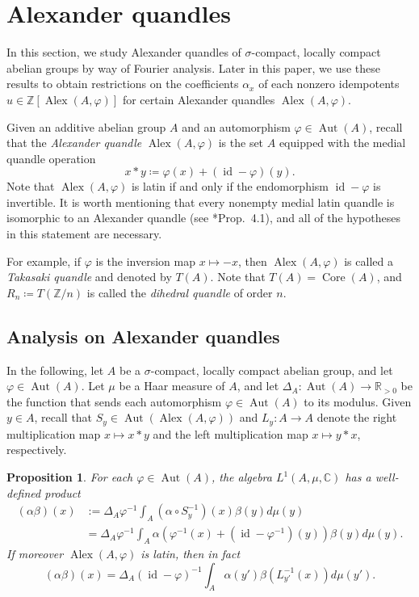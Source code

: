\documentclass[12pt]{amsart}
\newtheorem{pro}[thm]{Proposition}
\theoremstyle{definition}
\theoremstyle{remark}
\newcommand{\Id}{\operatorname{id}}
\newcommand{\C}{\mathbb{C}}
\newcommand{\R}{\mathbb{R}}
\newcommand{\Z}{\mathbb{Z}}
\renewcommand{\phi}{\varphi}
\def\Aut{\operatorname{Aut}}
\def\Core{\operatorname{Core}}
\def\Alex{\operatorname{Alex}}
\begin{document}
 


\section{Alexander quandles}\label{sec:alexander}

In this section, we study Alexander quandles of $\sigma$-compact, locally compact abelian groups by way of Fourier analysis. Later in this paper, we use these results to obtain restrictions on the coefficients $\alpha_x$ of each nonzero idempotents $u\in\Z[\Alex(A,\phi)]$ for certain Alexander quandles $\Alex(A,\phi)$.

Given an additive abelian group $A$ and an automorphism $\phi\in\Aut(A)$, recall that the \emph{Alexander quandle} $\Alex(A,\phi)$ is the set $A$ equipped with the medial quandle operation
\[
x*y\coloneq \phi(x)+(\Id-\phi)(y).
\]
Note that $\Alex(A,\phi)$ is latin if and only if the endomorphism $\Id-\phi$ is invertible.
It is worth mentioning that every nonempty medial latin quandle is isomorphic to an Alexander quandle (see \cite{ta-2026}*{Prop.\ 4.1}), and all of the hypotheses in this statement are necessary.

For example, if $\phi$ is the inversion map $x\mapsto -x$, then $\Alex(A,\phi)$ is called a \emph{Takasaki quandle} and denoted by $T(A)$. Note that $T(A)=\Core(A)$, and $R_n\coloneq T(\Z/n)$ is called the \emph{dihedral quandle} of order $n$. 

\subsection{Analysis on Alexander quandles}
In the following, let $A$ be a $\sigma$-compact, locally compact abelian group, and let $\phi\in\Aut(A)$. Let $\mu$ be a Haar measure of $A$, and let $\Delta_A\colon\Aut(A)\to\R_{>0}$ be the function that sends each automorphism $\phi\in\Aut(A)$ to its modulus. Given $y\in A$, recall that $S_y\in\Aut(\Alex(A,\phi))$ and $L_y\colon A\to A$ denote the right multiplication map $x\mapsto x*y$ and the left multiplication map $x\mapsto y*x$, respectively. 

\begin{pro}\label{pro:l1}
    For each $\phi\in\Aut(A)$, the algebra $L^1(A,\mu,\C)$ has a well-defined product
    \begin{align*}
        (\alpha \beta)(x) &:= \Delta_A\phi^{-1}\int_{ A}(\alpha \circ S_y^{-1})(x) \beta(y)d\mu(y)\\
        &= \Delta_A\phi^{-1}\int_{ A}\alpha (\phi^{-1}(x)+(\Id-\phi^{-1})(y) ) \beta(y)d\mu(y).
    \end{align*}
    If moreover $\Alex(A,\phi)$ is latin, then in fact \[ (\alpha \beta)(x) = \Delta_A(\Id-\phi)^{-1} \int_{ A}\alpha (y')   \beta(L_{y'}^{-1}(x))d\mu(y'). \]
\end{pro}
\end{document}
